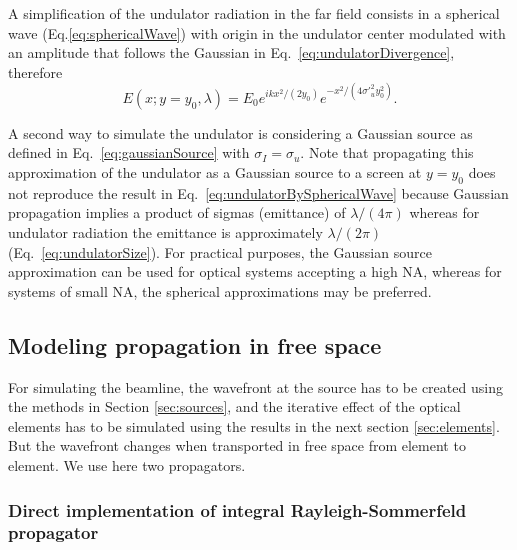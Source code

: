 \documentclass[preprint]{iucr}
\begin{document}
A  simplification of the undulator radiation in the far field consists in a spherical wave (Eq.\ref{eq:sphericalWave}) with origin in the undulator center modulated with an amplitude that follows the Gaussian in Eq.~\ref{eq:undulatorDivergence}, therefore
\begin{equation}
    \label{eq:undulatorBySphericalWave}
    E(x;y=y_0,\lambda) = E_0 e^{i k x^2 / (2 y_0)} e^{-x^2/(4 \sigma'_u^2 y_0^2)}.
\end{equation}

A second way to simulate the undulator is considering a Gaussian source as defined in Eq.~\ref{eq:gaussianSource} with $\sigma_I=\sigma_u$. Note that propagating this approximation of the undulator as a Gaussian source to a screen at $y=y_0$ does not reproduce the result in Eq.~\ref{eq:undulatorBySphericalWave} because Gaussian propagation implies a product of sigmas (emittance) of $\lambda / (4 \pi)$ whereas for undulator radiation the emittance is approximately $\lambda / (2 \pi)$ (Eq.~\ref{eq:undulatorSize}). For practical purposes, the Gaussian source approximation can be used for optical systems accepting a high NA, whereas for systems of small NA, the spherical approximations may be preferred.


\subsection{Modeling propagation in free space}
\label{sec:propagation}

For simulating the beamline, the wavefront at the source has to be created using the methods in Section \ref{sec:sources}, and the iterative effect of the optical elements has to be simulated using the results in the next section \ref{sec:elements}. But the wavefront changes when transported in free space from element to element. We use here two propagators. 

\subsubsection{Direct implementation of integral Rayleigh-Sommerfeld propagator}
\label{sec:integralPropagator}
\end{document}
